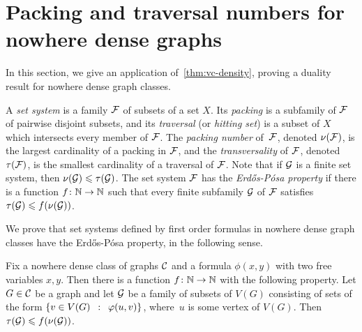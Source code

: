 \section{Packing and traversal numbers for nowhere dense graphs}\label{sec:ep}
In this section, we give an application 
of~\cref{thm:vc-density}, proving a 
duality result for nowhere dense graph classes.

A \emph{set system} is a family  $\cal F$ of subsets of a set $X$.
Its  \emph{packing} is a subfamily of $\cal F$ of pairwise disjoint subsets, and its \emph{traversal} (or \emph{hitting set}) is a subset of $X$ which intersects every member of $\cal F$.
The \emph{packing number} of~$\cal F$, denoted $\nu(\cal F)$, is the largest cardinality of a packing in $\cal F$,
and the \emph{transversality} of $\cal F$, denoted
$\tau(\cal F)$, is the smallest cardinality of a traversal of $\cal F$.
Note that if $\cal G$ is a finite set system, then
$\nu({\cal G})\le \tau(\cal G)$. 
The set system $\cal F$ has the \emph{Erd{\H o}s-P\'{o}sa property} if there is a function $f\from\N\to\N$ such that every finite subfamily $\cal G$ of $\cal F$
satisfies $\tau({\cal G})\le f(\nu(\cal G))$. 

We prove that set systems defined by first order formulas in nowhere dense graph classes have the Erd{\H o}s-P\'{o}sa property, in the following sense.

 \setcounter{aux}{\thetheorem}
 \setcounter{theorem}{\theep}
\begin{theorem}
	Fix a nowhere dense class of graphs $\CCC$ and a 
	formula $\phi(x,y)$ with two free variables $x,y$.
	Then there is a function $f\from \N\to\N$ with the following property.
	Let $G\in \CCC$ be a graph and let $\cal G$
	be a family of subsets of $V(G)$ consisting of sets of the form $\setof{v\in V(G)}{\phi(u, v)}$, where~$u$ is some vertex of $V(G)$.
Then~$\tau({\cal G})\le f(\nu(\cal G))$.
\end{theorem}
 \setcounter{theorem}{\theaux}


